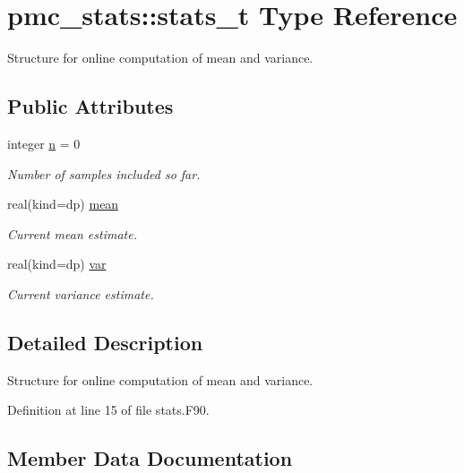 \hypertarget{structpmc__stats_1_1stats__t}{}\section{pmc\+\_\+stats\+:\+:stats\+\_\+t Type Reference}
\label{structpmc__stats_1_1stats__t}


Structure for online computation of mean and variance.  


\subsection*{Public Attributes}
\begin{DoxyCompactItemize}
\item 
integer \mbox{\hyperlink{structpmc__stats_1_1stats__t_a31f07e959a4828e31629660f555d5823}{n}} = 0
\begin{DoxyCompactList}\small\item\em Number of samples included so far. \end{DoxyCompactList}\item 
real(kind=dp) \mbox{\hyperlink{structpmc__stats_1_1stats__t_ad9f91e8d55c21424bbd48d4bf41932bf}{mean}}
\begin{DoxyCompactList}\small\item\em Current mean estimate. \end{DoxyCompactList}\item 
real(kind=dp) \mbox{\hyperlink{structpmc__stats_1_1stats__t_ad9ab56f6b99a2b0de1062dc6e9ea6c7a}{var}}
\begin{DoxyCompactList}\small\item\em Current variance estimate. \end{DoxyCompactList}\end{DoxyCompactItemize}


\subsection{Detailed Description}
Structure for online computation of mean and variance. 

Definition at line 15 of file stats.\+F90.



\subsection{Member Data Documentation}
\mbox{\label{structpmc__stats_1_1stats__t_ad9f91e8d55c21424bbd48d4bf41932bf}} 
